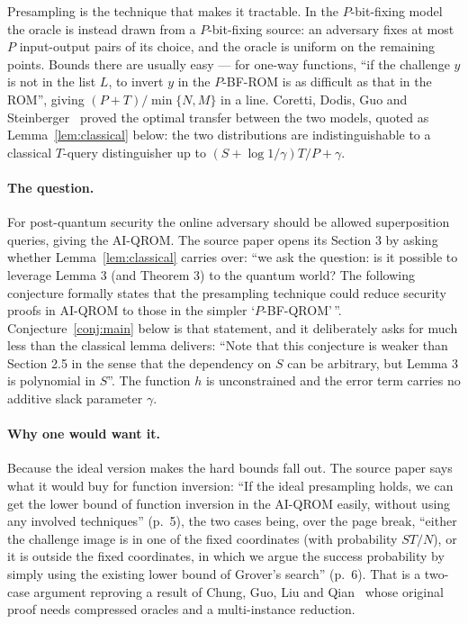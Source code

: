 \documentclass{conjura-conjecture}
\begin{document}
Presampling is the technique that makes it tractable. In the
$P$-bit-fixing model the oracle is instead drawn from a $P$-bit-fixing
source: an adversary fixes at most $P$ input-output pairs of its
choice, and the oracle is uniform on the remaining points. Bounds there
are usually easy --- for one-way functions, ``if the challenge $y$ is
not in the list $L$, to invert $y$ in the $P$-BF-ROM is as difficult as
that in the ROM'', giving $(P+T)/\min\{N,M\}$ in a line. Coretti, Dodis,
Guo and Steinberger~\cite{CDGS18} proved the optimal transfer between
the two models, quoted as Lemma~\ref{lem:classical} below: the two
distributions are indistinguishable to a classical $T$-query
distinguisher up to $(S + \log 1/\gamma)T/P + \gamma$.

\paragraph{The question.}
For post-quantum security the online adversary should be allowed
superposition queries, giving the AI-QROM\@. The source paper opens its
Section 3 by asking whether Lemma~\ref{lem:classical} carries over: ``we
ask the question: is it possible to leverage Lemma 3 (and Theorem 3) to
the quantum world? The following conjecture formally states that the
presampling technique could reduce security proofs in AI-QROM to those
in the simpler `$P$-BF-QROM'\,''. Conjecture~\ref{conj:main} below is that
statement, and it deliberately asks for much less than the classical
lemma delivers: ``Note that this conjecture is weaker than Section 2.5
in the sense that the dependency on $S$ can be arbitrary, but Lemma 3 is
polynomial in $S$''. The function $h$ is unconstrained and the error
term carries no additive slack parameter $\gamma$.

\paragraph{Why one would want it.}
Because the ideal version makes the hard bounds fall out. The source
paper says what it would buy for function inversion: ``If the ideal
presampling holds, we can get the lower bound of function inversion in
the AI-QROM easily, without using any involved techniques'' (p.~5), the
two cases being, over the page break, ``either the challenge image is in
one of the fixed coordinates (with probability $ST/N$), or it is outside
the fixed coordinates, in which we argue the success probability by
simply using the existing lower bound of Grover's search'' (p.~6). That
is a two-case argument reproving a result of
Chung, Guo, Liu and Qian~\cite{CGLQ20} whose original proof needs
compressed oracles and a multi-instance reduction.
\end{document}
